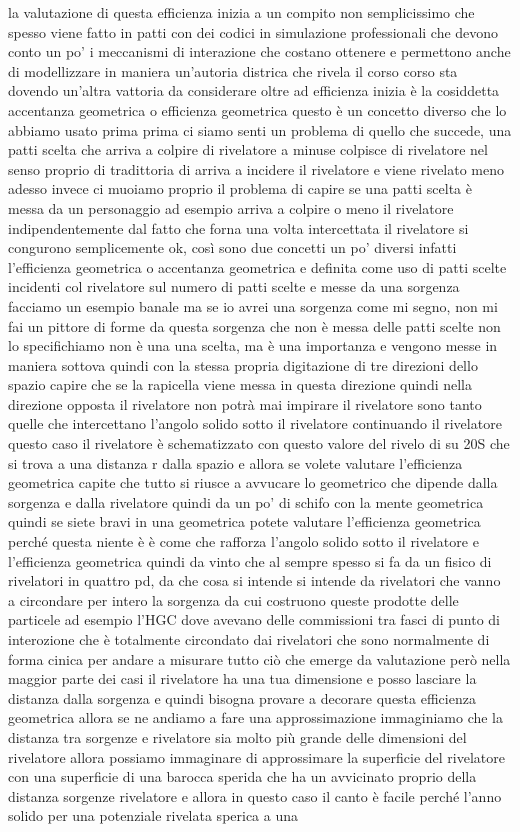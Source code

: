 la valutazione di questa efficienza inizia a un compito non semplicissimo che spesso viene fatto in patti con dei codici in simulazione professionali che devono conto un po' i meccanismi di interazione che costano ottenere e permettono anche di modellizzare in maniera un'autoria districa che rivela il corso corso sta dovendo un'altra vattoria da considerare oltre ad efficienza inizia è la cosiddetta accentanza geometrica o efficienza geometrica questo è un concetto diverso che lo abbiamo usato prima prima ci siamo senti un problema di quello che succede, una patti scelta che arriva a colpire di rivelatore a minuse colpisce di rivelatore nel senso proprio di tradittoria di arriva a incidere il rivelatore e viene rivelato meno adesso invece ci muoiamo proprio il problema di capire se una patti scelta è messa da un personaggio ad esempio arriva a colpire o meno il rivelatore indipendentemente dal fatto che forna una volta intercettata il rivelatore si congurono semplicemente ok, così sono due concetti un po' diversi infatti l'efficienza geometrica o accentanza geometrica e definita come uso di patti scelte incidenti col rivelatore sul numero di patti scelte e messe da una sorgenza facciamo un esempio banale ma se io avrei una sorgenza come mi segno, non mi fai un pittore di forme da questa sorgenza che non è messa delle patti scelte non lo specifichiamo non è una una scelta, ma è una importanza e vengono messe in maniera sottova quindi con la stessa propria digitazione di tre direzioni dello spazio capire che se la rapicella viene messa in questa direzione quindi nella direzione opposta il rivelatore non potrà mai impirare il rivelatore sono tanto quelle che intercettano l'angolo solido sotto il rivelatore continuando il rivelatore questo caso il rivelatore è schematizzato con questo valore del rivelo di su 20S che si trova a una distanza r dalla spazio e allora se volete valutare l'efficienza geometrica capite che tutto si riusce a avvucare lo geometrico che dipende dalla sorgenza e dalla rivelatore quindi da un po' di schifo con la mente geometrica quindi se siete bravi in una geometrica potete valutare l'efficienza geometrica perché questa niente è è come che rafforza l'angolo solido sotto il rivelatore e l'efficienza geometrica quindi da vinto che al sempre spesso si fa da un fisico di rivelatori in quattro pd, da che cosa si intende si intende da rivelatori che vanno a circondare per intero la sorgenza da cui costruono queste prodotte delle particele ad esempio l'HGC dove avevano delle commissioni tra fasci di punto di interozione che è totalmente circondato dai rivelatori che sono normalmente di forma cinica per andare a misurare tutto ciò che emerge da valutazione però nella maggior parte dei casi il rivelatore ha una tua dimensione e posso lasciare la distanza dalla sorgenza e quindi bisogna provare a decorare questa efficienza geometrica allora se ne andiamo a fare una approssimazione immaginiamo che la distanza tra sorgenze e rivelatore sia molto più grande delle dimensioni del rivelatore allora possiamo immaginare di approssimare la superficie del rivelatore con una superficie di una barocca sperida che ha un avvicinato proprio della distanza sorgenze rivelatore e allora in questo caso il canto è facile perché l'anno solido per una potenziale rivelata sperica a una 